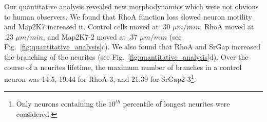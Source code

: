 Our quantitative analysis revealed new morphodynamics which
were not obvious to human  observers. We found that RhoA function loss
slowed  neuron motility and  Map2K7 increased  it.  Control cells
moved at  .30 $\mu  m / min$,  RhoA moved  at .23 $\mu  m /  min$, and
Map2K7-2     moved     at    .37     $\mu     m     /    min$     (see
Fig.~\ref{fig:quantitative_analysis}c).  We  also found that  RhoA and
SrGap  increased the  branching of  the
neurites (see Fig.~\ref{fig:quantitative_analysis}d).  Over the course
of a  neurites lifetime, the maximum  number of branches  in a control
neuron    was    14.5,   19.44    for    RhoA-3,    and   21.39    for
SrGap2-3\footnote{Only neurons containing  the  $10^{th}$  percentile  of
  longest neurites were considered.}.























